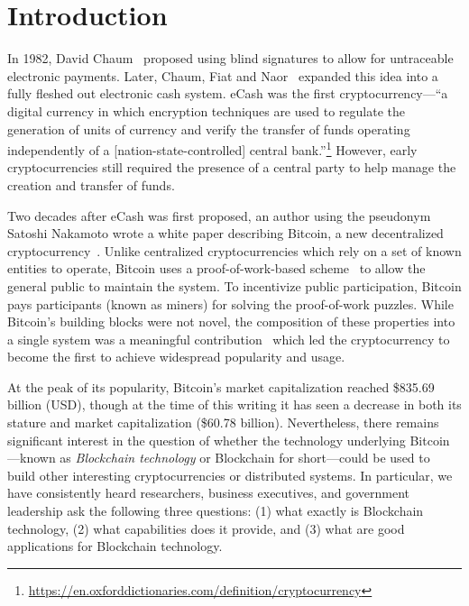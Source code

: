 
\section{Introduction}

In 1982, David Chaum~\cite{Cha82} proposed using blind signatures to allow for untraceable electronic payments.
Later, Chaum, Fiat and Naor~\cite{chaum1988untraceable} expanded this idea into a fully fleshed out electronic cash system.
eCash was the first cryptocurrency---\ie ``a digital currency in which encryption techniques are used to regulate the generation of units of currency and verify the transfer of funds operating independently of a [nation-state-controlled] central bank.''\footnote{\url{https://en.oxforddictionaries.com/definition/cryptocurrency}}
However, early cryptocurrencies still required the presence of a central party to help manage the creation and transfer of funds.

Two decades after eCash was first proposed, an author using the pseudonym Satoshi Nakamoto wrote a white paper describing Bitcoin, a new decentralized cryptocurrency~\cite{Nak08}.
Unlike centralized cryptocurrencies which rely on a set of known entities to operate, Bitcoin uses a proof-of-work-based scheme~\cite{DN93,back1997partial} to allow the general public to maintain the system.
To incentivize public participation, Bitcoin pays participants (known as miners) for solving the proof-of-work puzzles.
While Bitcoin's building blocks were not novel, the composition of these properties into a single system was a meaningful contribution~\cite{Narayanan17} which led the cryptocurrency to become the first to achieve widespread popularity and usage.

At the peak of its popularity, Bitcoin's market capitalization reached \$835.69 billion (USD), though at the time of this writing it has seen a decrease in both its stature and market capitalization (\$60.78 billion).
Nevertheless, there remains significant interest in the question of whether the technology underlying Bitcoin---known as \emph{Blockchain technology} or {Blockchain} for short---could be used to build other interesting cryptocurrencies or distributed systems.
In particular, we have consistently heard researchers, business executives, and government leadership ask the following three questions: (1) what exactly is Blockchain technology, (2) what capabilities does it provide, and (3) what are good applications for Blockchain technology.%

